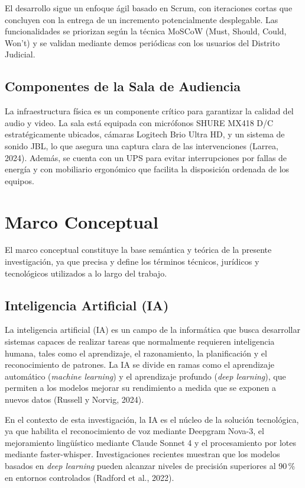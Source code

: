 \documentclass[12pt,a4paper,oneside]{report}
\begin{document}
El desarrollo sigue un enfoque ágil basado en Scrum, con iteraciones cortas que concluyen con la entrega de un incremento potencialmente desplegable. Las funcionalidades se priorizan según la técnica MoSCoW (Must, Should, Could, Won't) y se validan mediante demos periódicas con los usuarios del Distrito Judicial.

\subsection{Componentes de la Sala de Audiencia}

La infraestructura física es un componente crítico para garantizar la calidad del audio y video. La sala está equipada con micrófonos SHURE MX418 D/C estratégicamente ubicados, cámaras Logitech Brio Ultra HD, y un sistema de sonido JBL, lo que asegura una captura clara de las intervenciones (Larrea, 2024). Además, se cuenta con un UPS para evitar interrupciones por fallas de energía y con mobiliario ergonómico que facilita la disposición ordenada de los equipos.

\section{Marco Conceptual}

El marco conceptual constituye la base semántica y teórica de la presente investigación, ya que precisa y define los términos técnicos, jurídicos y tecnológicos utilizados a lo largo del trabajo.

\subsection{Inteligencia Artificial (IA)}

La inteligencia artificial (IA) es un campo de la informática que busca desarrollar sistemas capaces de realizar tareas que normalmente requieren inteligencia humana, tales como el aprendizaje, el razonamiento, la planificación y el reconocimiento de patrones. La IA se divide en ramas como el aprendizaje automático (\textit{machine learning}) y el aprendizaje profundo (\textit{deep learning}), que permiten a los modelos mejorar su rendimiento a medida que se exponen a nuevos datos (Russell y Norvig, 2024).

En el contexto de esta investigación, la IA es el núcleo de la solución tecnológica, ya que habilita el reconocimiento de voz mediante Deepgram Nova-3, el mejoramiento lingüístico mediante Claude Sonnet 4 y el procesamiento por lotes mediante faster-whisper. Investigaciones recientes muestran que los modelos basados en \textit{deep learning} pueden alcanzar niveles de precisión superiores al 90\,\% en entornos controlados (Radford et al., 2022).
\end{document}
